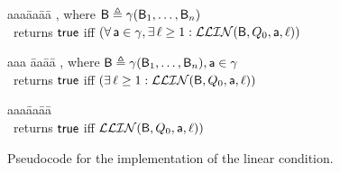\begin{figure}[H]
\setcounter{lctr}{0}
\begin{tabbing}\label{alg:check-df}
aaa\= aa\= aa\= \kill
{},  where $\mathsf{B} \triangleq \gamma(\mathsf{B}_1,\dots,\mathsf{B}_n)$\\
\cmnt\ returns $\mathsf{true}$ iff $(\forall\, \mathsf{a} \in \gamma, \exists\, \ell \ge 1: \mathcal{LLIN}(\mathsf{B}, Q_0, \mathsf{a}, \ell))$\\
\lio{\ENDFOR;}
\end{tabbing}

\setcounter{lctr}{0}
\begin{tabbing}\label{alg:checkInt}
aaa \= aa\= aa\= \kill
{},  where $\mathsf{B} \triangleq \gamma(\mathsf{B}_1,\dots,\mathsf{B}_n), \mathsf{a} \in \gamma$\\
\cmnt\ returns $\mathsf{true}$ iff $(\exists\, \ell \ge 1: \mathcal{LLIN}(\mathsf{B}, Q_0, \mathsf{a}, \ell))$\\
\lio{\WHILEC{\ttt}}
\lio{\ENDWHILE}
\end{tabbing}

\setcounter{lctr}{0}
\begin{tabbing}
\label{alg:eval-ldfc}
aaa\= aa\= aa\= \kill
{}\\
\cmnt\ returns $\mathsf{true}$ iff $\mathcal{LLIN}(\mathsf{B}, Q_0, \mathsf{a}, \ell))$\\
  \lit{\FI}
\lio{\ENDFOR;}
\end{tabbing}

\caption{Pseudocode for the implementation of the linear condition.}

\label{fig:impl.locLin} 
\label{fig:implementation}
\label{fig:implementation-checkDF}
\end{figure}

